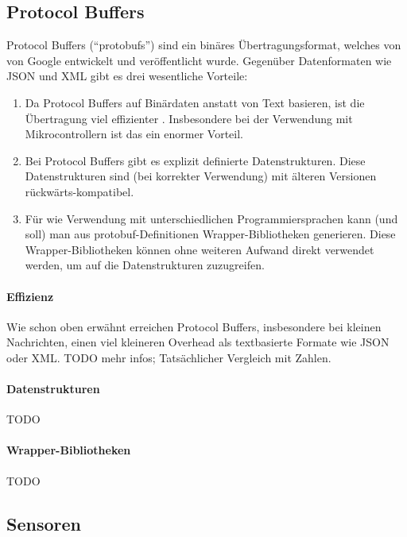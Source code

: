 \subsection{Protocol Buffers}
\label{subsec:ueberblick_protobufs}
Protocol Buffers \cite{protobufs} (``protobufs'') sind ein binäres Übertragungsformat,
welches von von Google entwickelt und veröffentlicht wurde.
%
Gegenüber Datenformaten wie JSON und XML gibt es drei wesentliche Vorteile:
\begin{enumerate}
    \item Da Protocol Buffers auf Binärdaten anstatt von Text basieren,
    ist die Übertragung viel effizienter \cite{7765670}.
    Insbesondere bei der Verwendung mit Mikrocontrollern ist das ein enormer Vorteil.

    \item Bei Protocol Buffers gibt es explizit definierte Datenstrukturen.
    Diese Datenstrukturen sind (bei korrekter Verwendung) mit älteren Versionen rückwärts-kompatibel.

    \item Für wie Verwendung mit unterschiedlichen Programmiersprachen kann (und soll) man aus protobuf-Definitionen
    Wrapper-Bibliotheken generieren.
    Diese Wrapper-Bibliotheken können ohne weiteren Aufwand direkt verwendet werden,
    um auf die Datenstrukturen zuzugreifen.
\end{enumerate}

\paragraph{Effizienz}
Wie schon oben erwähnt erreichen Protocol Buffers,
insbesondere bei kleinen Nachrichten,
einen viel kleineren Overhead als textbasierte Formate wie JSON oder XML.
%
TODO mehr infos; Tatsächlicher Vergleich mit Zahlen.


\paragraph{Datenstrukturen}
TODO

\paragraph{Wrapper-Bibliotheken}
TODO

\subsection{Sensoren}
\label{subsec:ueberblick_sensors}

